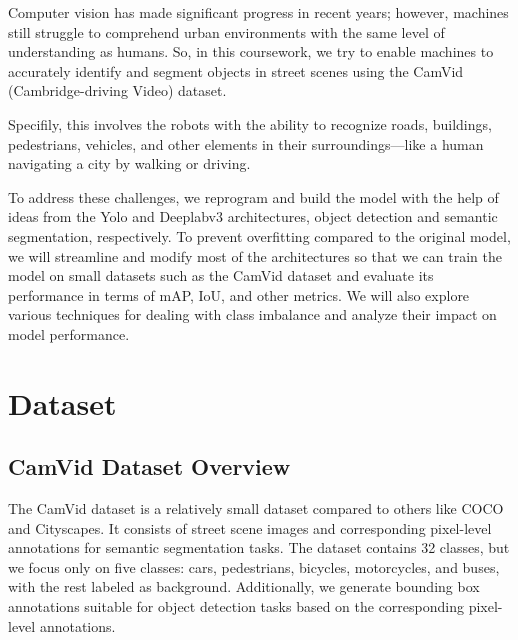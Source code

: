 \documentclass[conference]{IEEEtran}
\begin{document}
Computer vision has made significant progress in recent years; however, machines still struggle to comprehend urban environments with the same level of understanding as humans. So, in this coursework, we try to enable machines to accurately identify and segment objects in street scenes using the CamVid (Cambridge-driving Video) dataset.\cite{b3}
 
Specifily, this involves the robots with the ability to recognize roads, buildings, pedestrians, vehicles, and other elements in their surroundings—like a human navigating a city by walking or driving.

To address these challenges, we reprogram and build the model with the help of ideas from the Yolo and Deeplabv3 architectures, object detection and semantic segmentation, respectively. To prevent overfitting compared to the original model, we will streamline and modify most of the architectures so that we can train the model on small datasets such as the CamVid dataset and evaluate its performance in terms of mAP, IoU, and other metrics. We will also explore various techniques for dealing with class imbalance and analyze their impact on model performance.
\section{Dataset}
\subsection{CamVid Dataset Overview}
The CamVid dataset is a relatively small dataset compared to others like COCO and Cityscapes. It consists of street scene images and corresponding pixel-level annotations for semantic segmentation tasks. The dataset contains 32 classes, but we focus only on five classes: cars, pedestrians, bicycles, motorcycles, and buses, with the rest labeled as background. Additionally, we generate bounding box annotations suitable for object detection tasks based on the corresponding pixel-level annotations.
\end{document}
